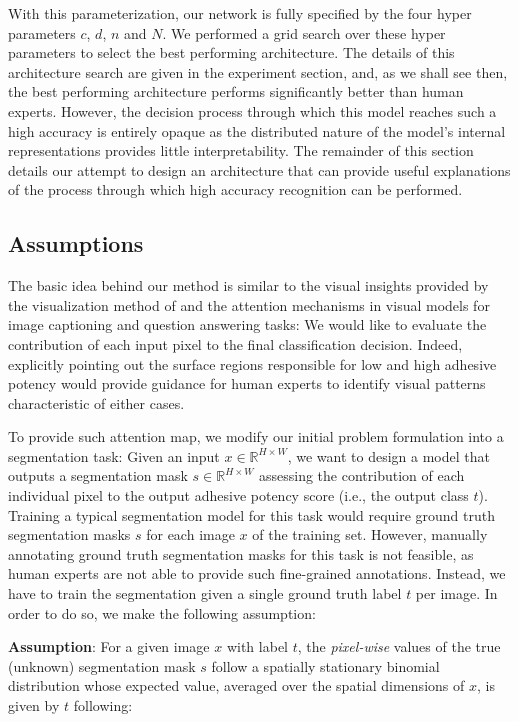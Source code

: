 \documentclass[10pt,twocolumn,letterpaper]{article}
\begin{document}
With this parameterization, our network is fully specified by the four hyper parameters $c$, $d$, $n$ and $N$.
We performed a grid search over these hyper parameters to select the best performing architecture.
The details of this architecture search are given in the experiment section,
and, as we shall see then, the best performing architecture performs significantly better than human experts.
However, the decision process through which this model reaches such a high accuracy is entirely opaque
as the distributed nature of the model's internal representations provides little interpretability.
The remainder of this section details our attempt to design an architecture that can provide 
useful explanations of the process through which high accuracy recognition can be performed.

\subsection{Assumptions}
The basic idea behind our method is similar to the visual insights provided by the
visualization method of \cite{xxx} and the attention mechanisms in visual models 
for image captioning and question answering tasks:
We would like to evaluate the contribution of each input pixel to the final classification decision.
Indeed, explicitly pointing out the surface regions responsible 
for low and high adhesive potency would provide guidance for human experts to 
identify visual patterns characteristic of either cases.

To provide such attention map, we modify our initial problem formulation into a segmentation task:
Given an input $x \in \mathbb{R}^{H \times W}$, we want to design a model that outputs 
a segmentation mask $s \in \mathbb{R}^{H \times W}$ assessing the contribution of each individual pixel to the output adhesive potency score (i.e., the output class $t$).
Training a typical segmentation model for this task would require ground truth 
segmentation masks $s$ for each image $x$ of the training set.
However, manually annotating ground truth segmentation masks for this task is not feasible, 
as human experts are not able to provide such fine-grained annotations.
Instead, we have to train the segmentation given a single ground truth label $t$ per image.
In order to do so, we make the following assumption:

\textbf{Assumption}: 
For a given image $x$ with label $t$, 
the \textit{pixel-wise} values of the true (unknown) segmentation mask $s$
follow a spatially stationary binomial distribution whose expected value, 
averaged over the spatial dimensions of $x$, is given by $t$ following:
\end{document}
